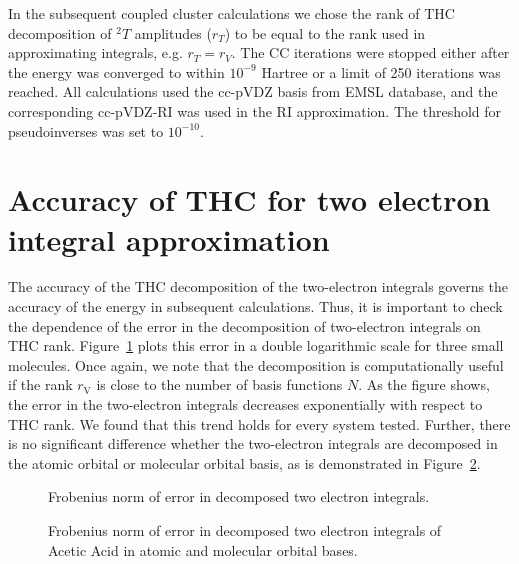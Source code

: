 In the subsequent coupled cluster calculations we chose the rank of THC 
decomposition of ${}^2T$ amplitudes ($r_{T}$) to be equal to the rank 
used in approximating integrals, e.g. $r_{T} = r_{V}$. 
The CC iterations were stopped either after the energy was converged to within 
$10^{-9}$ Hartree or a limit of 250 iterations 
was reached. All calculations used the cc-pVDZ basis from EMSL
database,\cite{schuchardt2007basis} and the corresponding cc-pVDZ-RI
was used in the RI approximation. The threshold for pseudoinverses was set to 
$10^{-10}$.

\section{Accuracy of THC for two electron integral approximation}
The accuracy of the THC decomposition of the two-electron integrals governs the
accuracy of the energy in subsequent calculations. Thus, it is important to 
check the dependence of the error in the decomposition of
two-electron integrals on THC rank. Figure~\ref{fig:thc_err_mo_3systems} plots 
this error in a double logarithmic scale for three small molecules. Once again, 
we note that the decomposition is computationally useful if the rank 
$r_\mathrm{V}$ is close to the number of basis functions $N$.  As the figure 
shows, the error in the two-electron integrals decreases exponentially with
respect to THC rank. We found that this trend holds for every system
tested. Further, there is no significant difference whether the two-electron 
integrals are decomposed in the atomic orbital or molecular orbital basis, as 
is demonstrated in Figure~\ref{fig:thc_err_ao_vs_mo}.

%
\begin{figure}[tb]
\caption{Frobenius norm of error in decomposed two electron integrals.
\label{fig:thc_err_mo_3systems}}
\end{figure}
%
\begin{figure}[tb]
\caption{Frobenius norm of error in decomposed two electron integrals of Acetic 
Acid in atomic and molecular orbital bases.
\label{fig:thc_err_ao_vs_mo}}
\end{figure}
%

